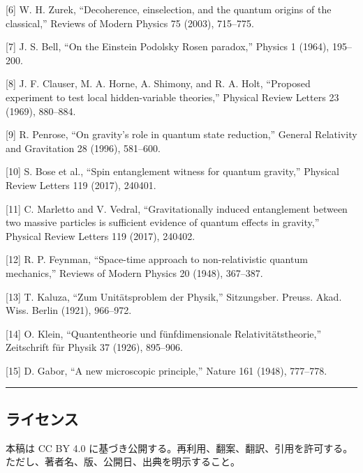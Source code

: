 \documentclass[
]{ltjsarticle}
\begin{document}
{[}6{]} W. H. Zurek, ``Decoherence, einselection, and the quantum
origins of the classical,'' Reviews of Modern Physics 75 (2003),
715--775.

{[}7{]} J. S. Bell, ``On the Einstein Podolsky Rosen paradox,'' Physics
1 (1964), 195--200.

{[}8{]} J. F. Clauser, M. A. Horne, A. Shimony, and R. A. Holt,
``Proposed experiment to test local hidden-variable theories,'' Physical
Review Letters 23 (1969), 880--884.

{[}9{]} R. Penrose, ``On gravity's role in quantum state reduction,''
General Relativity and Gravitation 28 (1996), 581--600.

{[}10{]} S. Bose et al., ``Spin entanglement witness for quantum
gravity,'' Physical Review Letters 119 (2017), 240401.

{[}11{]} C. Marletto and V. Vedral, ``Gravitationally induced
entanglement between two massive particles is sufficient evidence of
quantum effects in gravity,'' Physical Review Letters 119 (2017),
240402.

{[}12{]} R. P. Feynman, ``Space-time approach to non-relativistic
quantum mechanics,'' Reviews of Modern Physics 20 (1948), 367--387.

{[}13{]} T. Kaluza, ``Zum Unitätsproblem der Physik,'' Sitzungsber.
Preuss. Akad. Wiss. Berlin (1921), 966--972.

{[}14{]} O. Klein, ``Quantentheorie und fünfdimensionale
Relativitätstheorie,'' Zeitschrift für Physik 37 (1926), 895--906.

{[}15{]} D. Gabor, ``A new microscopic principle,'' Nature 161 (1948),
777--778.

\begin{center}\rule{0.5\linewidth}{0.5pt}\end{center}

\subsection{ライセンス}\label{ux30e9ux30a4ux30bbux30f3ux30b9}

本稿は CC BY 4.0
に基づき公開する。再利用、翻案、翻訳、引用を許可する。ただし、著者名、版、公開日、出典を明示すること。
\end{document}
